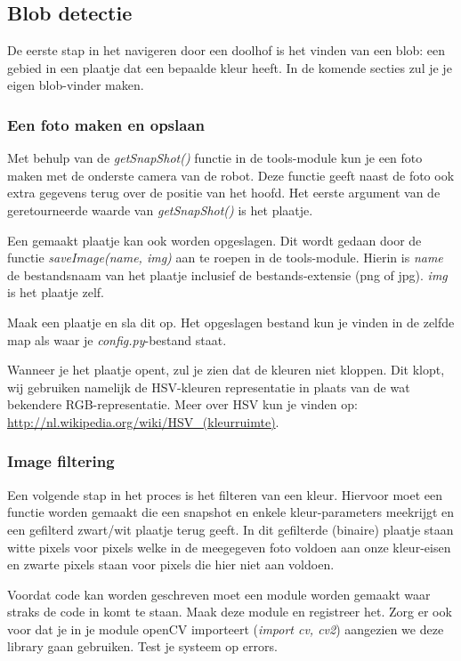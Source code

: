 \documentclass[a4paper]{article}
\begin{document}
\subsection{Blob detectie}
De eerste stap in het navigeren door een doolhof is het vinden van een blob: een gebied in een plaatje dat een bepaalde kleur heeft. In de komende secties zul je je eigen blob-vinder maken.

\subsubsection{Een foto maken en opslaan}
Met behulp van de \textit{getSnapShot()} functie in de tools-module kun je een foto maken met de onderste camera van de robot. Deze functie geeft naast de foto ook extra gegevens terug over de positie van het hoofd. Het eerste argument van de geretourneerde waarde van \textit{getSnapShot()} is het plaatje.

Een gemaakt plaatje kan ook worden opgeslagen. Dit wordt gedaan door de functie \textit{saveImage(name, img)} aan te roepen in de tools-module. Hierin is \textit{name} de bestandsnaam van het plaatje inclusief de bestands-extensie (png of jpg). \textit{img} is het plaatje zelf.

Maak een plaatje en sla dit op. Het opgeslagen bestand kun je vinden in de zelfde map als waar je \textit{config.py}-bestand staat.

Wanneer je het plaatje opent, zul je zien dat de kleuren niet kloppen. Dit klopt, wij gebruiken namelijk de HSV-kleuren representatie in plaats van de wat bekendere RGB-representatie.
Meer over HSV kun je vinden op: \url{http://nl.wikipedia.org/wiki/HSV_(kleurruimte)}.

\subsubsection{Image filtering}
Een volgende stap in het proces is het filteren van een kleur. Hiervoor moet een functie worden gemaakt die een snapshot en enkele kleur-parameters meekrijgt en een gefilterd zwart/wit plaatje terug geeft. In dit gefilterde (binaire) plaatje staan witte pixels voor pixels welke in de meegegeven foto voldoen aan onze kleur-eisen en zwarte pixels staan voor pixels die hier niet aan voldoen.

Voordat code kan worden geschreven moet een module worden gemaakt waar straks de code in komt te staan. Maak deze module en registreer het. Zorg er ook voor dat je in je module openCV importeert (\textit{import cv, cv2}) aangezien we deze library gaan gebruiken. Test je systeem op errors.
\end{document}
